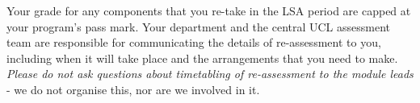 Your grade for any components that you re-take in the LSA period are capped at your program's pass mark.
Your department and the central UCL assessment team are responsible for communicating the details of re-assessment to you, including when it will take place and the arrangements that you need to make.
\emph{Please do not ask questions about timetabling of re-assessment to the module leads} - we do not organise this, nor are we involved in it.

